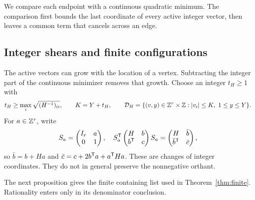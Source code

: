 We compare each endpoint with a continuous quadratic minimum. The comparison first bounds the last coordinate of every active integer vector, then leaves a common term that cancels across an edge.


\subsection{Integer shears and finite configurations}
The active vectors can grow with the location of a vertex. Subtracting the integer part of the continuous minimizer removes that growth. Choose an integer $t_H\ge1$ with
\begin{equation}\label{eq:alphabet}
 t_H\ge\max_i\sqrt{(H^{-1})_{ii}},\qquad K=Y+t_H,
 \qquad
 \mathcal D_H=\{(v,y)\in\mathbb Z^r\times\mathbb Z:|v_i|\le K,\ 1\le y\le Y\}.
\end{equation}
For $a\in\mathbb Z^r$, write
\begin{equation}\label{eq:shear}
 S_a=\begin{pmatrix}I_r&a\\0&1\end{pmatrix},\quad
 S_a^{\mathsf T}\begin{pmatrix}H&b\\b^{\mathsf T}&c\end{pmatrix}S_a
 =\begin{pmatrix}H&\bar b\\\bar b^{\mathsf T}&\bar c\end{pmatrix},
\end{equation}
so $\bar b=b+Ha$ and $\bar c=c+2b^{\mathsf T} a+a^{\mathsf T} Ha$. These are changes of integer coordinates. They do not in general preserve the nonnegative orthant.

The next proposition gives the finite containing list used in Theorem~\ref{thm:finite}. Rationality enters only in its denominator conclusion.

